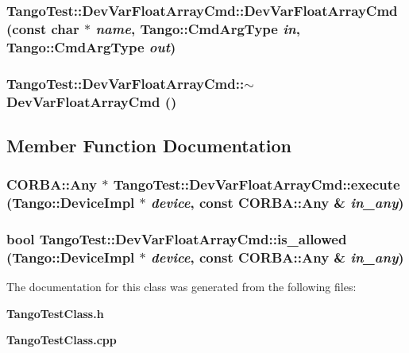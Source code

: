 \subsubsection{\setlength{\rightskip}{0pt plus 5cm}Tango\-Test::Dev\-Var\-Float\-Array\-Cmd::Dev\-Var\-Float\-Array\-Cmd (const char $\ast$ {\em name}, Tango::Cmd\-Arg\-Type {\em in}, Tango::Cmd\-Arg\-Type {\em out})}\label{classTangoTest_1_1DevVarFloatArrayCmd_a1}


\subsubsection{\setlength{\rightskip}{0pt plus 5cm}Tango\-Test::Dev\-Var\-Float\-Array\-Cmd::$\sim$Dev\-Var\-Float\-Array\-Cmd ()\hspace{0.3cm}{\tt  [inline]}}\label{classTangoTest_1_1DevVarFloatArrayCmd_a2}




\subsection{Member Function Documentation}
\subsubsection{\setlength{\rightskip}{0pt plus 5cm}CORBA::Any $\ast$ Tango\-Test::Dev\-Var\-Float\-Array\-Cmd::execute (Tango::Device\-Impl $\ast$ {\em device}, const CORBA::Any \& {\em in\_\-any})\hspace{0.3cm}{\tt  [virtual]}}\label{classTangoTest_1_1DevVarFloatArrayCmd_a4}


\subsubsection{\setlength{\rightskip}{0pt plus 5cm}bool Tango\-Test::Dev\-Var\-Float\-Array\-Cmd::is\_\-allowed (Tango::Device\-Impl $\ast$ {\em device}, const CORBA::Any \& {\em in\_\-any})\hspace{0.3cm}{\tt  [virtual]}}\label{classTangoTest_1_1DevVarFloatArrayCmd_a3}




The documentation for this class was generated from the following files:\begin{CompactItemize}
\item 
{\bf Tango\-Test\-Class.h}\item 
{\bf Tango\-Test\-Class.cpp}\end{CompactItemize}
